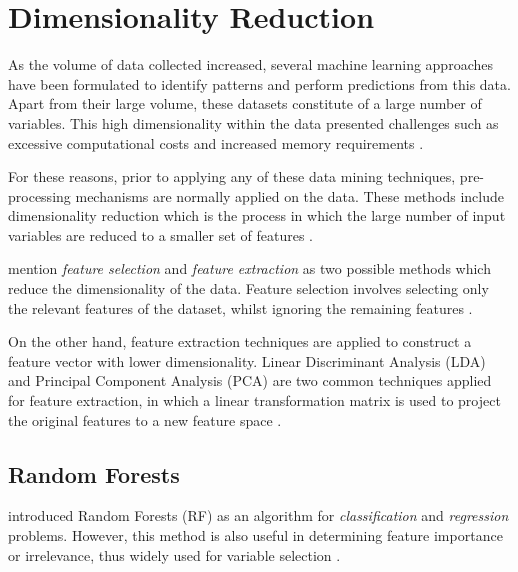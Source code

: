 \chapter{Dimensionality Reduction}
\label{ch:dimensionality reduction}

As the volume of data collected increased, several machine learning approaches have been formulated to identify patterns and perform predictions from this data. Apart from their large volume, these datasets constitute of a large number of variables. This high dimensionality within the data presented challenges such as excessive computational costs and increased memory requirements \citep{featureselectionforhighdimensionaldata}. 

For these reasons, prior to applying any of these data mining techniques, pre-processing mechanisms are normally applied on the data. These methods include dimensionality reduction which is the process in which the large number of input variables are reduced to a smaller set of features \citep{Sorzano2014}.

\citet{DataShrinkingBasedFeatureRankingforProteinClassification} mention \textit{feature selection} and \textit{feature extraction} as two possible methods which reduce the dimensionality of the data. Feature selection involves selecting only the relevant features of the dataset, whilst ignoring the remaining features \citep{DataShrinkingBasedFeatureRankingforProteinClassification}. 

On the other hand, feature extraction techniques are applied to construct a feature vector with lower dimensionality. Linear Discriminant Analysis (LDA) and Principal Component Analysis (PCA) are two common techniques applied for feature extraction, in which a linear transformation matrix is used to project the original features to a new feature space \citep{Wang2003}. 

\section{Random Forests}

\citet{Breiman2001} introduced Random Forests (RF) as an algorithm for \textit{classification} and \textit{regression} problems. However, this method is also useful in determining feature importance or irrelevance, thus widely used for variable selection \citep{Genuer2010}.

